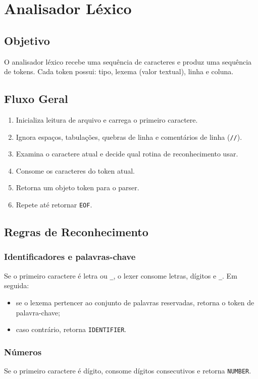 \documentclass[12pt,a4paper]{article}
\begin{document}
\section{Analisador Léxico}

\subsection{Objetivo}
O analisador léxico recebe uma sequência de caracteres e produz uma sequência de tokens. Cada token possui: tipo, lexema (valor textual), linha e coluna.

\subsection{Fluxo Geral}
\begin{enumerate}[label=\arabic*.]
  \item Inicializa leitura de arquivo e carrega o primeiro caractere.
  \item Ignora espaços, tabulações, quebras de linha e comentários de linha (\texttt{//}).
  \item Examina o caractere atual e decide qual rotina de reconhecimento usar.
  \item Consome os caracteres do token atual.
  \item Retorna um objeto token para o parser.
  \item Repete até retornar \texttt{EOF}.
\end{enumerate}

\subsection{Regras de Reconhecimento}
\subsubsection{Identificadores e palavras-chave}
Se o primeiro caractere é letra ou \texttt{\_}, o lexer consome letras, dígitos e \texttt{\_}. Em seguida:
\begin{itemize}
  \item se o lexema pertencer ao conjunto de palavras reservadas, retorna o token de palavra-chave;
  \item caso contrário, retorna \texttt{IDENTIFIER}.
\end{itemize}

\subsubsection{Números}
Se o primeiro caractere é dígito, consome dígitos consecutivos e retorna \texttt{NUMBER}.
\end{document}
